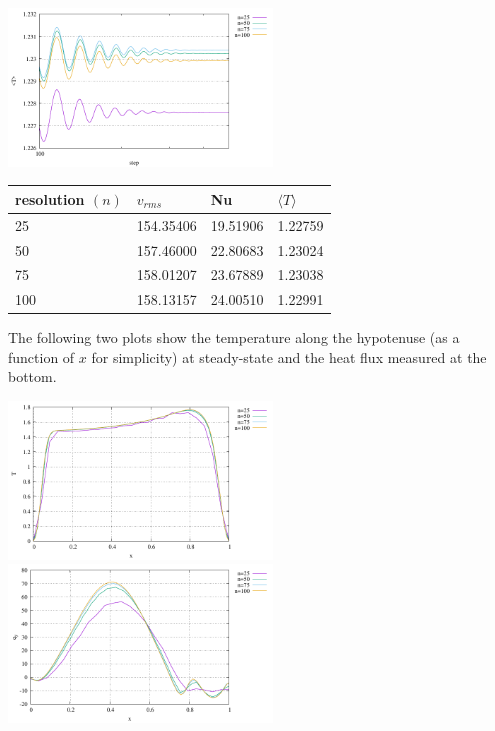 \begin{center}
\includegraphics[width=7cm]{python_codes/fieldstone_51/images/avrgT_res_zoom.pdf}\\
\end{center}

\begin{center}
\begin{tabular}{llll}
\hline
resolution $(n)$ & $v_{rms}$ & Nu & $\langle T \rangle$ \\
\hline
\hline
25  & 154.35406 & 19.51906 &  1.22759\\
50  & 157.46000 & 22.80683 &  1.23024\\
75  & 158.01207 & 23.67889 &  1.23038\\
100 & 158.13157 & 24.00510 &  1.22991\\
\hline
\end{tabular}
\end{center}

The following two plots show the temperature along the hypotenuse (as a function of $x$
for simplicity) at steady-state and the heat flux measured at the bottom. 
\begin{center}
\includegraphics[width=7cm]{python_codes/fieldstone_51/images/temp_hyp_res.pdf}
\includegraphics[width=7cm]{python_codes/fieldstone_51/images/qy_bot_res.pdf}
\end{center}

